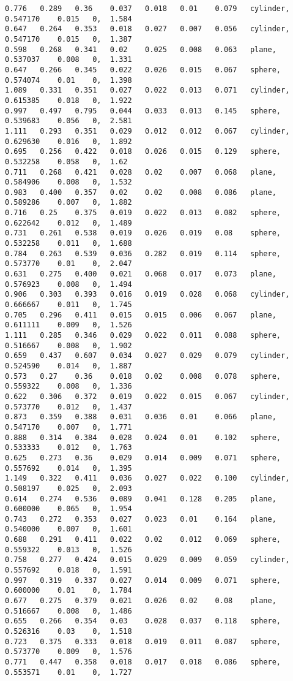{\begin{lstlisting}[caption={Datos obtenidos para la prueba del cilindro usando AE.}]
0.776	0.289	0.36	0.037	0.018	0.01	0.079	cylinder, 	0.547170	0.015	0, 	1.584
0.647	0.264	0.353	0.018	0.027	0.007	0.056	cylinder, 	0.547170	0.015	0, 	1.387
0.598	0.268	0.341	0.02	0.025	0.008	0.063	plane,  	0.537037	0.008	0, 	1.331
0.647	0.266	0.345	0.022	0.026	0.015	0.067	sphere, 	0.574074	0.01	0, 	1.398
1.089	0.331	0.351	0.027	0.022	0.013	0.071	cylinder, 	0.615385	0.018	0, 	1.922
0.997	0.497	0.795	0.044	0.033	0.013	0.145	sphere, 	0.539683	0.056	0, 	2.581
1.111	0.293	0.351	0.029	0.012	0.012	0.067	cylinder, 	0.629630	0.016	0, 	1.892
0.695	0.256	0.422	0.018	0.026	0.015	0.129	sphere, 	0.532258	0.058	0, 	1.62
0.711	0.268	0.421	0.028	0.02	0.007	0.068	plane,  	0.584906	0.008	0, 	1.532
0.983	0.400	0.357	0.02	0.02	0.008	0.086	plane,  	0.589286	0.007	0, 	1.882
0.716	0.25	0.375	0.019	0.022	0.013	0.082	sphere, 	0.622642	0.012	0, 	1.489
0.731	0.261	0.538	0.019	0.026	0.019	0.08	sphere, 	0.532258	0.011	0, 	1.688
0.784	0.263	0.539	0.036	0.282	0.019	0.114	sphere, 	0.573770	0.01	0, 	2.047
0.631	0.275	0.400	0.021	0.068	0.017	0.073	plane,  	0.576923	0.008	0, 	1.494
0.906	0.303	0.393	0.016	0.019	0.028	0.068	cylinder, 	0.666667	0.011	0, 	1.745
0.705	0.296	0.411	0.015	0.015	0.006	0.067	plane,  	0.611111	0.009	0, 	1.526
1.111	0.285	0.346	0.029	0.022	0.011	0.088	sphere, 	0.516667	0.008	0, 	1.902
0.659	0.437	0.607	0.034	0.027	0.029	0.079	cylinder, 	0.524590	0.014	0, 	1.887
0.573	0.27	0.36	0.018	0.02	0.008	0.078	sphere, 	0.559322	0.008	0, 	1.336
0.622	0.306	0.372	0.019	0.022	0.015	0.067	cylinder, 	0.573770	0.012	0, 	1.437
0.873	0.359	0.388	0.031	0.036	0.01	0.066	plane,  	0.547170	0.007	0, 	1.771
0.888	0.314	0.384	0.028	0.024	0.01	0.102	sphere, 	0.533333	0.012	0, 	1.763
0.625	0.273	0.36	0.029	0.014	0.009	0.071	sphere, 	0.557692	0.014	0, 	1.395
1.149	0.322	0.411	0.036	0.027	0.022	0.100	cylinder, 	0.508197	0.025	0, 	2.093
0.614	0.274	0.536	0.089	0.041	0.128	0.205	plane,  	0.600000	0.065	0, 	1.954
0.743	0.272	0.353	0.027	0.023	0.01	0.164	plane,  	0.540000	0.007	0, 	1.601
0.688	0.291	0.411	0.022	0.02	0.012	0.069	sphere, 	0.559322	0.013	0, 	1.526
0.758	0.277	0.424	0.015	0.029	0.009	0.059	cylinder, 	0.557692	0.018	0, 	1.591
0.997	0.319	0.337	0.027	0.014	0.009	0.071	sphere, 	0.600000	0.01	0, 	1.784
0.677	0.275	0.379	0.021	0.026	0.02	0.08	plane,  	0.516667	0.008	0, 	1.486
0.655	0.266	0.354	0.03	0.028	0.037	0.118	sphere, 	0.526316	0.03	0, 	1.518
0.723	0.375	0.333	0.018	0.019	0.011	0.087	sphere, 	0.573770	0.009	0, 	1.576
0.771	0.447	0.358	0.018	0.017	0.018	0.086	sphere, 	0.553571	0.01	0, 	1.727
\end{lstlisting}
}$ $ \\

